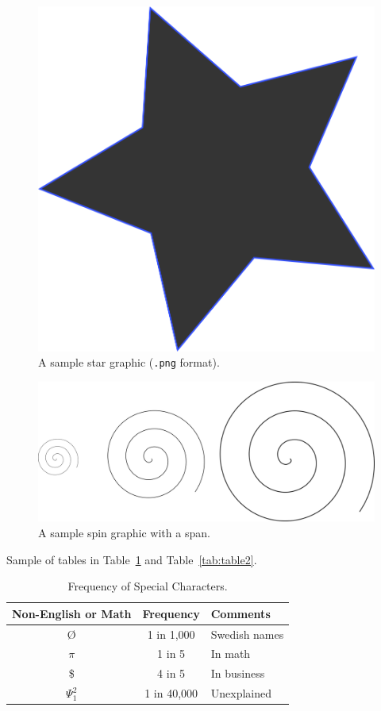 \documentclass[article,english]{stucosrec}
\begin{document}
	\begin{figure}
		\centering
		\includegraphics[scale=0.5]{star.png}
		\caption{A sample star graphic (\texttt{.png} format).}
		\label{fig:star}
	\end{figure}
	
	\begin{figure}
		\centering
		\includegraphics[scale=0.8]{spin.png}
		\caption{A sample spin graphic with a span.}
		\label{fig:spin}
	\end{figure}
	
	Sample of tables in Table~\ref{tab:table1} and Table~\ref{tab:table2}.
	
	\begin{table}
		\centering
		\caption{Frequency of Special Characters.}
		\label{tab:table1}
		\begin{tabular}{|c|c|l|} \hline
			Non-English or Math&Frequency&Comments\\ \hline
			\O & 1 in 1,000& Swedish names\\ \hline
			$\pi$ & 1 in 5& In math\\ \hline
			\$ & 4 in 5 & In business\\ \hline
			$\Psi^2_1$ & 1 in 40,000& Unexplained \\ \hline
		\end{tabular}
	\end{table}
	
\end{document}
